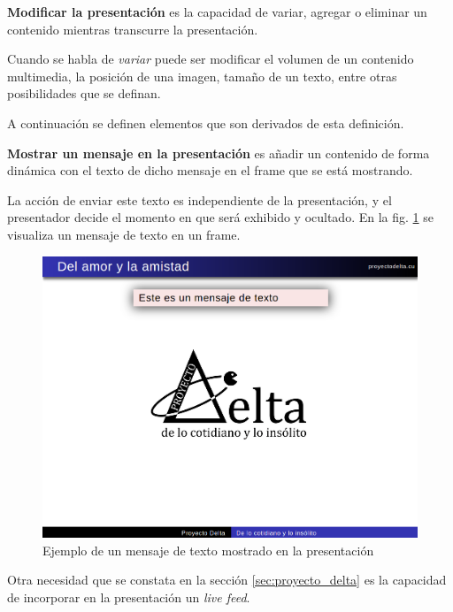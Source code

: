 		\begin{definition}
		\label{def:presentation_modification}
			\textbf{Modificar la presentación} es la capacidad de variar, agregar o eliminar un contenido mientras transcurre la presentación.
		\end{definition}

		Cuando se habla de \textit{variar} puede ser modificar el volumen de un contenido multimedia, la posición de una imagen, tamaño de un texto, entre otras posibilidades que se definan.

		A continuación se definen elementos que son derivados de esta definición.

		\begin{definition}
		\label{def:message}
			\textbf{Mostrar un mensaje en la presentación} es añadir un contenido de forma dinámica con el texto de dicho mensaje en el frame que se está mostrando. 
		\end{definition}

		La acción de enviar este texto es independiente de la presentación, y el presentador decide el momento en que será exhibido y ocultado. En la fig. \ref{fig:msg} se visualiza un mensaje de texto en un frame.


		\begin{figure}[tb]
			\centering
			\includegraphics[width=12cm]{img/text_msg}
			\caption{Ejemplo de un mensaje de texto mostrado en la presentación}
			\label{fig:msg}
		\end{figure}

		Otra necesidad que se constata en la sección \ref{sec:proyecto_delta} es la capacidad de incorporar en la presentación un \textit{live feed}.

